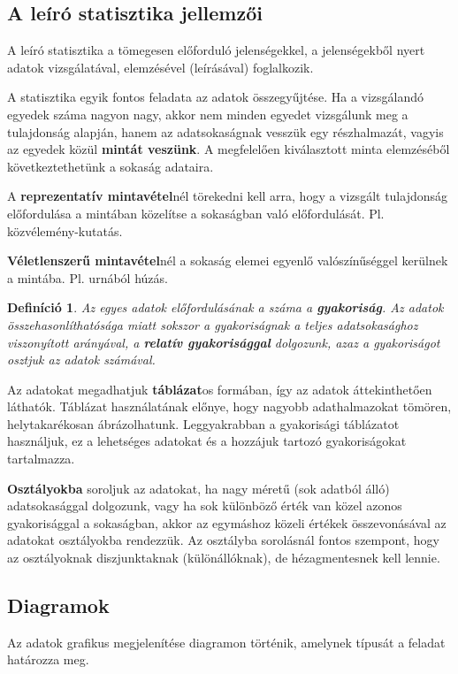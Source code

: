 \documentclass[12pt,a4paper]{article}
\newtheorem{definition}{Definíció} [section]
\begin{document}
\subsection{A leíró statisztika jellemzői}
A leíró statisztika a tömegesen előforduló jelenségekkel, a jelenségekből nyert adatok vizsgálatával, elemzésével (leírásával) foglalkozik.

A statisztika egyik fontos feladata az adatok összegyűjtése. Ha a vizsgálandó egyedek száma nagyon nagy, akkor nem minden egyedet vizsgálunk meg a tulajdonság alapján, hanem az adatsokaságnak vesszük egy részhalmazát, vagyis az egyedek közül \textbf{mintát veszünk}. A megfelelően kiválasztott minta elemzéséből következtethetünk a sokaság adataira.

A \textbf{reprezentatív mintavétel}nél törekedni kell arra, hogy a vizsgált tulajdonság előfordulása a mintában közelítse a sokaságban való előfordulását. Pl. közvélemény-kutatás.

\textbf{Véletlenszerű mintavétel}nél a sokaság elemei egyenlő valószínűséggel kerülnek a mintába. Pl. urnából húzás.

\begin{definition}
Az egyes adatok előfordulásának a száma a \textbf{gyakoriság}. Az adatok összehasonlíthatósága miatt sokszor a gyakoriságnak a teljes adatsokasághoz viszonyított arányával, a \textbf{relatív gyakorisággal} dolgozunk, azaz a gyakoriságot osztjuk az adatok számával.
\end{definition}

Az adatokat megadhatjuk \textbf{táblázat}os formában, így az adatok áttekinthetően láthatók. Táblázat használatának előnye, hogy nagyobb adathalmazokat tömören, helytakarékosan ábrázolhatunk. Leggyakrabban a gyakorisági táblázatot használjuk, ez a lehetséges adatokat és a hozzájuk tartozó gyakoriságokat tartalmazza.

\textbf{Osztályokba} soroljuk az adatokat, ha nagy méretű (sok adatból álló) adatsokasággal dolgozunk, vagy ha sok különböző érték van közel azonos gyakorisággal a sokaságban, akkor az egymáshoz közeli értékek összevonásával az adatokat osztályokba rendezzük. Az osztályba sorolásnál fontos szempont, hogy az osztályoknak diszjunktaknak (különállóknak), de hézagmentesnek kell lennie.

\subsection{Diagramok}
Az adatok grafikus megjelenítése diagramon történik, amelynek típusát a feladat határozza meg.
\end{document}
